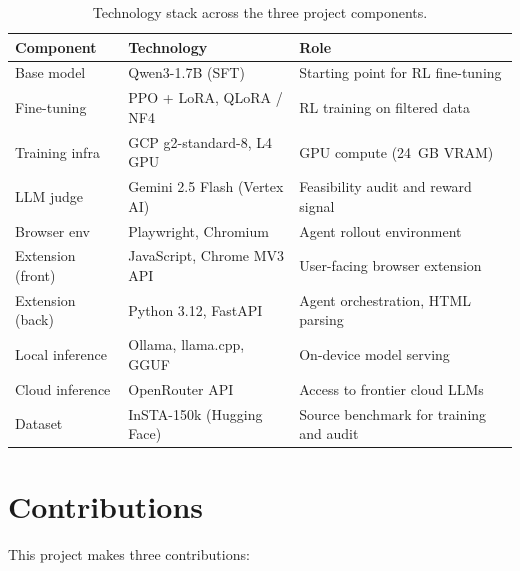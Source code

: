 \documentclass[12pt,a4paper]{report}
\begin{document}
\begin{table}[h]
\centering
\small
\begin{tabular}{p{3cm}p{4.5cm}p{5.5cm}}
\toprule
\textbf{Component} & \textbf{Technology} & \textbf{Role} \\
\midrule
Base model        & Qwen3-1.7B (SFT)            & Starting point for RL fine-tuning \\
Fine-tuning       & PPO + LoRA, QLoRA / NF4     & RL training on filtered data \\
Training infra    & GCP g2-standard-8, L4 GPU   & GPU compute (24~GB VRAM) \\
LLM judge         & Gemini 2.5 Flash (Vertex AI) & Feasibility audit and reward signal \\
Browser env       & Playwright, Chromium        & Agent rollout environment \\
Extension (front) & JavaScript, Chrome MV3 API  & User-facing browser extension \\
Extension (back)  & Python 3.12, FastAPI        & Agent orchestration, HTML parsing \\
Local inference   & Ollama, llama.cpp, GGUF     & On-device model serving \\
Cloud inference   & OpenRouter API              & Access to frontier cloud LLMs \\
Dataset           & InSTA-150k (Hugging Face)   & Source benchmark for training and audit \\
\bottomrule
\end{tabular}
\caption{Technology stack across the three project components.}
\label{tab:techstack}
\end{table}

\section{Contributions}

This project makes three contributions:
\end{document}
